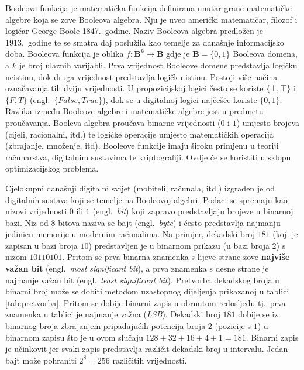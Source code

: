 \documentclass[times, utf8, diplomski]{fer}
\begin{document}
Booleova funkcija je matematička funkcija definirana unutar grane matematičke algebre koja se zove Booleova algebra. Nju je uveo američki matematičar, filozof i logičar George Boole 1847.~godine. Naziv Booleova algebra predložen je 1913.~godine te se smatra daj poslužila kao temelje za današnje informacijsko doba. Booleova funkcija je oblika $f:\boldsymbol{B}^{k}\mapsto \boldsymbol{B}$ gdje je $\boldsymbol{B}=\{0, 1\}$ Booleova domena, a $k$ je broj ulaznih varijabli. Prva vrijednost Booleove domene predstavlja logičku neistinu, dok druga vrijednost predstavlja logičku istinu. Postoji više načina označavanja tih dviju vrijednosti. U propozicijskoj logici često se koriste $\{\bot, \top \}$ i $\{F, T\}$ (engl.~\textit{$\{False, True\}$}), dok se u digitalnoj logici najčešće koriste $\{0, 1\}$. Razlika između Booleove algebre i matematičke algebre jest u predmetu proučavanja. Booleva algebra proučava binarne vrijednosti ($0$ i $1$) umjesto brojeva (cijeli, racionalni, itd.) te logičke operacije umjesto matematičkih operacija (zbrajanje, množenje, itd). Booleove funkcije imaju široku primjenu u teoriji računarstva, digitalnim sustavima te kriptografiji. Ovdje će se koristiti u sklopu optimizacijskog problema.

Cjelokupni današnji digitalni svijet (mobiteli, računala, itd.) izgrađen je od digitalnih sustava koji se temelje na Booleovoj algebri. Podaci se spremaju kao nizovi vrijednosti $0$ ili $1$ (engl.~\textit{bit}) koji zapravo predstavljaju brojeve u binarnoj bazi. Niz od $8$ bitova naziva se bajt (engl.~\textit{byte}) i često predstavlja najmanju jedinicu memorije u modernim računalima. Na primjer, dekadski broj $181$ (koji je zapisan u bazi broja $10$) predstavljen je u binarnom prikazu (u bazi broja $2$) s nizom $10110101$. Pritom se prva binarna znamenka s lijeve strane zove \textbf{najviše važan bit} (engl.~\textit{most significant bit}), a prva znamenka s desne strane je najmanje važan bit (engl.~\textit{least significant bit}). Pretvorba dekadskog broja u binarni broj može se dobiti metodom uzastopnog dijeljenja prikazanoj u tablici \ref{tab:pretvorba}. Pritom se dobije binarni zapis u obrnutom redosljedu tj.~prva znamenka u tablici je najmanje važna (\textit{LSB}). Dekadski broj $181$ dobije se iz binarnog broja zbrajanjem pripadajućih potencija broja $2$ (pozicije s $1$) u binarnom zapisu što je u ovom slučaju $128+32+16+4+1=181$. Binarni zapis je učinkovit jer svaki zapis predstavlja različit dekadski broj u intervalu. Jedan bajt može pohraniti $2^{8}=256$ različitih vrijednosti.
\end{document}
